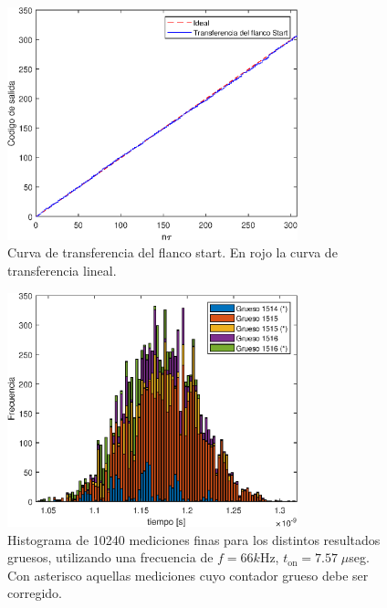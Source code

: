 \begin{figure}[H]
     \centering
     \includegraphics[width=0.75\textwidth]{imagenes/transferencia_start.eps}
     \caption{Curva de transferencia del flanco start. En rojo la curva de transferencia
     lineal.}
     \label{fig: transferencia_start}
\end{figure}


\begin{figure}[H]
      \centering
      \includegraphics[width=0.75\textwidth]{imagenes/histograma_66k.eps}
      \caption{Histograma de 10240 mediciones finas para los distintos resultados gruesos, 
      utilizando una frecuencia de $f=66k$Hz, $t_{\text{on}}=7.57 \; \mu$seg. 
      Con asterisco aquellas mediciones cuyo contador grueso debe ser corregido.}
      \label{fig: histograma_66}
\end{figure}


